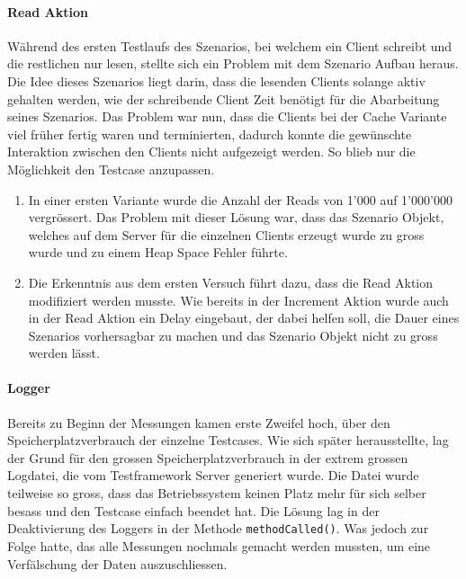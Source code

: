 \paragraph{Read Aktion}
Während des ersten Testlaufs des Szenarios, bei welchem ein Client schreibt und die restlichen nur lesen, stellte sich ein Problem mit dem Szenario Aufbau heraus. Die Idee dieses Szenarios liegt darin, dass die lesenden Clients solange aktiv gehalten werden, wie der schreibende Client Zeit benötigt für die Abarbeitung seines Szenarios. Das Problem war nun, dass die Clients bei der Cache Variante viel früher fertig waren und terminierten, dadurch konnte die gewünschte Interaktion zwischen den Clients nicht aufgezeigt werden. So blieb nur die Möglichkeit den Testcase anzupassen.
\begin{enumerate}
\item In einer ersten Variante wurde die Anzahl der Reads von 1'000 auf 1'000'000 vergrössert. Das Problem mit dieser Lösung war, dass das Szenario Objekt, welches auf dem Server für die einzelnen Clients erzeugt wurde zu gross wurde und zu einem Heap Space Fehler führte.
\item Die Erkenntnis aus dem ersten Versuch führt dazu, dass die Read Aktion modifiziert werden musste. Wie bereits in der Increment Aktion wurde auch in der Read Aktion ein Delay eingebaut, der dabei helfen soll, die Dauer eines Szenarios vorhersagbar zu machen und das Szenario Objekt nicht zu gross werden lässt.
\end{enumerate}

\paragraph{Logger}
Bereits zu Beginn der Messungen kamen erste Zweifel hoch, über den Speicherplatzverbrauch der einzelne Testcases. Wie sich später herausstellte, lag der Grund für den grossen Speicherplatzverbrauch in der extrem grossen Logdatei, die vom Testframework Server generiert wurde. Die Datei wurde teilweise so gross, dass das Betriebssystem keinen Platz mehr für sich selber besass und den Testcase einfach beendet hat. Die Lösung lag in der Deaktivierung des Loggers in der Methode \verb+methodCalled()+. Was jedoch zur Folge hatte, das alle Messungen nochmals gemacht werden mussten, um eine Verfälschung der Daten auszuschliessen.


